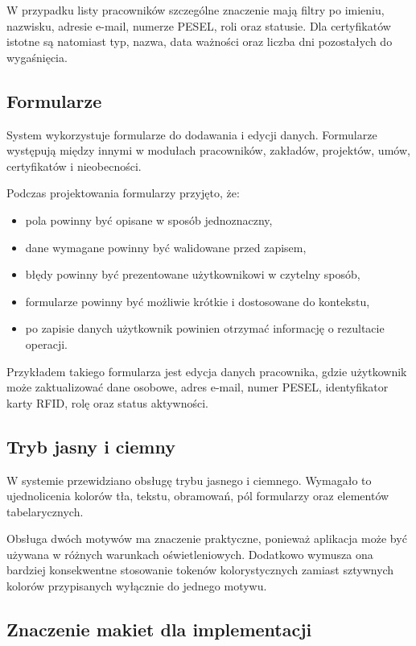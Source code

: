 W przypadku listy pracowników szczególne znaczenie mają filtry po imieniu, nazwisku, adresie e-mail, numerze PESEL, roli oraz statusie. Dla certyfikatów istotne są natomiast typ, nazwa, data ważności oraz liczba dni pozostałych do wygaśnięcia.

\subsection{Formularze}

System wykorzystuje formularze do dodawania i edycji danych. Formularze występują między innymi w modułach pracowników, zakładów, projektów, umów, certyfikatów i nieobecności.

Podczas projektowania formularzy przyjęto, że:
\begin{itemize}
    \item pola powinny być opisane w sposób jednoznaczny,
    \item dane wymagane powinny być walidowane przed zapisem,
    \item błędy powinny być prezentowane użytkownikowi w czytelny sposób,
    \item formularze powinny być możliwie krótkie i dostosowane do kontekstu,
    \item po zapisie danych użytkownik powinien otrzymać informację o rezultacie operacji.
\end{itemize}

Przykładem takiego formularza jest edycja danych pracownika, gdzie użytkownik może zaktualizować dane osobowe, adres e-mail, numer PESEL, identyfikator karty RFID, rolę oraz status aktywności.

\subsection{Tryb jasny i ciemny}

W systemie przewidziano obsługę trybu jasnego i ciemnego. Wymagało to ujednolicenia kolorów tła, tekstu, obramowań, pól formularzy oraz elementów tabelarycznych.

Obsługa dwóch motywów ma znaczenie praktyczne, ponieważ aplikacja może być używana w różnych warunkach oświetleniowych. Dodatkowo wymusza ona bardziej konsekwentne stosowanie tokenów kolorystycznych zamiast sztywnych kolorów przypisanych wyłącznie do jednego motywu.

\subsection{Znaczenie makiet dla implementacji}

